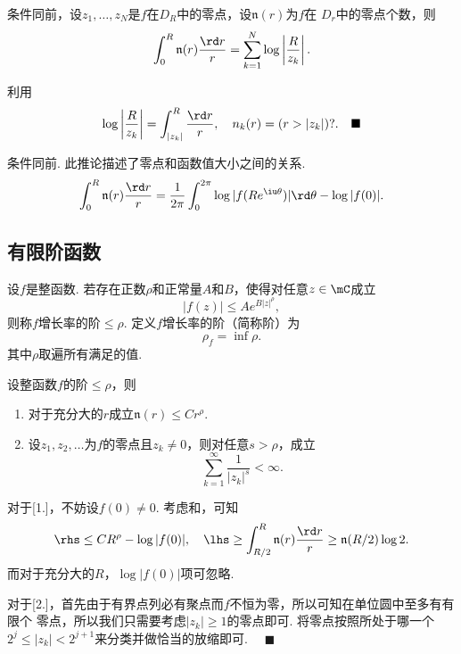   \begin{lemma}
    条件同前，设$z_1,\dots,z_N$是$f$在$D_R$中的零点，设$\mathfrak{n}(r)$为$f$在
    $D_r$中的零点个数，则
    \[
      \int_0^R \mathfrak{n}(r)\frac{\rd r}{r} = 
      \sum_{k=1}^N\log\left| \frac{R}{z_k} \right|.
    \]
  \end{lemma}
  \proof
    利用
    \[
      \log\left| \frac{R}{z_k} \right|=\int_{|z_k|}^R\frac{\rd r}{r},
      \quad n_k(r) = ( r > |z_k| )?.\quad\blacksquare
    \]

  \begin{cor}
    \label{cor: 整函数、零点、模}
    条件同前. 此推论描述了零点和函数值大小之间的关系.
    \[
      \int_0^R\mathfrak{n}(r)\frac{\rd r}{r} = \frac{1}{2\pi}
      \int_0^{2\pi}\log|f(Re^{\iu\theta})|\rd\theta - \log|f(0)|.
    \]
  \end{cor}


\subsection{有限阶函数}
  \begin{defi}
    \label{defi: 整函数的阶}
    设$f$是整函数. 若存在正数$\rho$和正常量$A$和$B$，使得对任意$z\in\mC$成立
    \begin{equation}
      \label{equ: 整函数的阶、小于等于}
      |f(z)| \le Ae^{B|z|^\rho},
    \end{equation}
    则称$f$增长率的阶$\le\rho$. 定义$f$增长率的阶（简称阶）为
    \[
      \rho_f = \inf\rho.
    \]
    其中$\rho$取遍所有满足的值.
  \end{defi}

  \begin{thm}
    设整函数$f$的阶$\le\rho$，则
    \begin{enumerate}
      \item 对于充分大的$r$成立$\mathfrak{n}(r)\le Cr^\rho$.
      \item 设$z_1,z_2,\dots$为$f$的零点且$z_k\ne 0$，则对任意$s>\rho$，成立
        \[
          \sum_{k=1}^\infty\frac{1}{|z_k|^s} < \infty.
        \]
    \end{enumerate}
  \end{thm}
  \remark
  \proof
    对于[1.]，不妨设$f(0)\ne 0$. 考虑和，可知
    \[\begin{split}
      \rhs \le CR^\rho-\log|f(0)|,\quad
      \lhs \ge \int_{R/2}^R\mathfrak{n}(r)\frac{\rd r}{r}\ge 
      \mathfrak{n}(R/2)\log 2.
    \end{split}\]
    而对于充分大的$R$，$\log|f(0)|$项可忽略.\par
    对于[2.]，首先由于有界点列必有聚点而$f$不恒为零，所以可知在单位圆中至多有有限个
    零点，所以我们只需要考虑$|z_k|\ge 1$的零点即可. 将零点按照所处于哪一个$2^j\le
    |z_k|<2^{j+1}$来分类并做恰当的放缩即可. $\quad\blacksquare$

